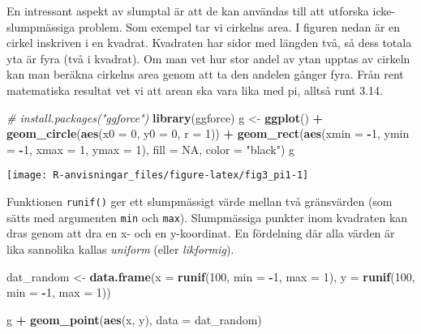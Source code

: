 \documentclass[
]{book}
\newenvironment{Shaded}{\begin{snugshade}}{\end{snugshade}}
\newcommand{\AttributeTok}[1]{\textcolor[rgb]{0.13,0.29,0.53}{#1}}
\newcommand{\CommentTok}[1]{\textcolor[rgb]{0.56,0.35,0.01}{\textit{#1}}}
\newcommand{\ConstantTok}[1]{\textcolor[rgb]{0.56,0.35,0.01}{#1}}
\newcommand{\DecValTok}[1]{\textcolor[rgb]{0.00,0.00,0.81}{#1}}
\newcommand{\FunctionTok}[1]{\textcolor[rgb]{0.13,0.29,0.53}{\textbf{#1}}}
\newcommand{\NormalTok}[1]{#1}
\newcommand{\OtherTok}[1]{\textcolor[rgb]{0.56,0.35,0.01}{#1}}
\newcommand{\SpecialCharTok}[1]{\textcolor[rgb]{0.81,0.36,0.00}{\textbf{#1}}}
\newcommand{\StringTok}[1]{\textcolor[rgb]{0.31,0.60,0.02}{#1}}
\theoremstyle{definition}
\theoremstyle{definition}
\theoremstyle{definition}
\theoremstyle{definition}
\theoremstyle{remark}
\begin{document}
En intressant aspekt av slumptal är att de kan användas till att utforska icke-slumpmässiga problem. Som exempel tar vi cirkelns area. I figuren nedan är en cirkel inskriven i en kvadrat. Kvadraten har sidor med längden två, så dess totala yta är fyra (två i kvadrat). Om man vet hur stor andel av ytan upptas av cirkeln kan man beräkna cirkelns area genom att ta den andelen gånger fyra. Från rent matematiska resultat vet vi att arean ska vara lika med pi, alltså runt 3.14.

\begin{Shaded}
\begin{Highlighting}[]
\CommentTok{\# install.packages("ggforce")}
\FunctionTok{library}\NormalTok{(ggforce)}
\NormalTok{g }\OtherTok{\textless{}{-}} \FunctionTok{ggplot}\NormalTok{() }\SpecialCharTok{+} 
  \FunctionTok{geom\_circle}\NormalTok{(}\FunctionTok{aes}\NormalTok{(}\AttributeTok{x0 =} \DecValTok{0}\NormalTok{, }\AttributeTok{y0 =} \DecValTok{0}\NormalTok{, }\AttributeTok{r =} \DecValTok{1}\NormalTok{)) }\SpecialCharTok{+} 
  \FunctionTok{geom\_rect}\NormalTok{(}\FunctionTok{aes}\NormalTok{(}\AttributeTok{xmin =} \SpecialCharTok{{-}}\DecValTok{1}\NormalTok{, }\AttributeTok{ymin =} \SpecialCharTok{{-}}\DecValTok{1}\NormalTok{, }\AttributeTok{xmax =} \DecValTok{1}\NormalTok{, }\AttributeTok{ymax =} \DecValTok{1}\NormalTok{), }\AttributeTok{fill =} \ConstantTok{NA}\NormalTok{, }\AttributeTok{color =} \StringTok{"black"}\NormalTok{)}
\NormalTok{g}
\end{Highlighting}
\end{Shaded}

\begin{center}\texttt{[image: R-anvisningar\_files/figure-latex/fig3\_pi1-1]} \end{center}

Funktionen \texttt{runif()} ger ett slumpmässigt värde mellan två gränsvärden (som sätts med argumenten \texttt{min} och \texttt{max}). Slumpmässiga punkter inom kvadraten kan dras genom att dra en x- och en y-koordinat. En fördelning där alla värden är lika sannolika kallas \emph{uniform} (eller \emph{likformig}).

\begin{Shaded}
\begin{Highlighting}[]
\NormalTok{dat\_random }\OtherTok{\textless{}{-}} \FunctionTok{data.frame}\NormalTok{(}\AttributeTok{x =} \FunctionTok{runif}\NormalTok{(}\DecValTok{100}\NormalTok{, }\AttributeTok{min =} \SpecialCharTok{{-}}\DecValTok{1}\NormalTok{, }\AttributeTok{max =} \DecValTok{1}\NormalTok{),}
                         \AttributeTok{y =} \FunctionTok{runif}\NormalTok{(}\DecValTok{100}\NormalTok{, }\AttributeTok{min =} \SpecialCharTok{{-}}\DecValTok{1}\NormalTok{, }\AttributeTok{max =} \DecValTok{1}\NormalTok{))}

\NormalTok{g }\SpecialCharTok{+} \FunctionTok{geom\_point}\NormalTok{(}\FunctionTok{aes}\NormalTok{(x, y), }\AttributeTok{data =}\NormalTok{ dat\_random)}
\end{Highlighting}
\end{Shaded}
\end{document}
